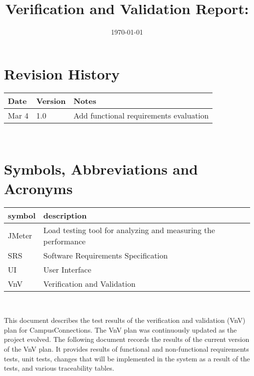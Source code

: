 \documentclass[12pt, titlepage]{article}
\begin{document}
\title{Verification and Validation Report: \progname} 
\author{\authname}
\date{\today}
	
\maketitle


\section{Revision History}

\begin{tabularx}{\textwidth}{p{3cm}p{2cm}X}
\toprule {\bf Date} & {\bf Version} & {\bf Notes}\\
\midrule
Mar 4 & 1.0 & Add functional requirements evaluation\\
\bottomrule
\end{tabularx}

~\newpage

\section{Symbols, Abbreviations and Acronyms}

\renewcommand{\arraystretch}{1.2}
\begin{tabular}{l l} 
  \toprule		
  \textbf{symbol} & \textbf{description}\\
  \midrule 
  JMeter & Load testing tool for analyzing and measuring the performance\\
  \midrule 
  SRS & Software Requirements Specification\\
  \midrule 
  UI & User Interface\\
  \midrule 
  VnV & Verification and Validation\\
  \bottomrule
\end{tabular}\\

\newpage

\tableofcontents

\listoftables %

\listoffigures %

\newpage


This document describes the test results of the verification and validation (VnV) plan for CampusConnections. The VnV plan was continuously updated as the project evolved. The following document records the results of the current version of the VnV plan. It provides results of functional and non-functional requirements tests, unit tests, changes that will be implemented in the system as a result of the tests, and various traceability tables.
\end{document}
